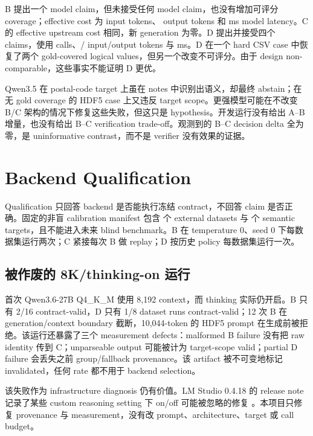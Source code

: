 \documentclass[UTF8,fontset=fandol,11pt]{ctexart}
\begin{document}
B 提出一个 model claim，但未接受任何 model claim，也没有增加可评分 coverage；effective cost 为 \DevBInput{} input tokens、\DevBOutput{} output tokens 和 \DevBLatency{} ms model latency。C 的 effective upstream cost 相同，新 generation 为零。D 提出并接受四个 claims，使用 \DevDCalls{} calls、\DevDInput{}/\DevDOutput{} input/output tokens 与 \DevDLatency{} ms。D 在一个 hard CSV case 中恢复了两个 gold-covered logical values，但另一个改变不可评分。由于 design non-comparable，这些事实不能证明 D 更优。

Qwen3.5 在 postal-code target 上虽在 notes 中识别出语义，却最终 abstain；在无 gold coverage 的 HDF5 case 上又违反 target scope。更强模型可能在不改变 B/C 架构的情况下修复这些失败，但这只是 hypothesis。开发运行没有给出 A--B 增量，也没有给出 B--C verification trade-off。观测到的 B--C decision delta 全为零，是 uninformative contrast，而不是 verifier 没有效果的证据。

\section{Backend Qualification}

Qualification 只回答 backend 是否能执行冻结 contract，不回答 claim 是否正确。固定的非盲 calibration manifest 包含 \QualificationCases{} 个 external datasets 与 \QualificationTargets{} 个 semantic targets，且不能进入未来 blind benchmark。B 在 temperature 0、seed 0 下每数据集运行两次；C 紧接每次 B 做 replay；D 按历史 policy 每数据集运行一次。

\subsection{被作废的 8K/thinking-on 运行}

首次 Qwen3.6-27B Q4\_K\_M 使用 8,192 context，而 thinking 实际仍开启。B 只有 2/16 contract-valid，D 只有 1/8 dataset runs contract-valid；12 次 B 在 generation/context boundary 截断，10,044-token 的 HDF5 prompt 在生成前被拒绝。该运行还暴露了三个 measurement defects：malformed B failure 没有把 raw identity 传到 C；unparseable output 可能被计为 target-scope valid；partial D failure 会丢失之前 group/fallback provenance。该 artifact 被不可变地标记 invalidated，任何 rate 都不用于 backend selection。

该失败作为 infrastructure diagnosis 仍有价值。LM Studio 0.4.18 的 release note 记录了某些 custom reasoning setting 下 on/off 可能被忽略的修复 \cite{lmstudio_0418}。本项目只修复 provenance 与 measurement，没有改 prompt、architecture、target 或 call budget。
\end{document}
